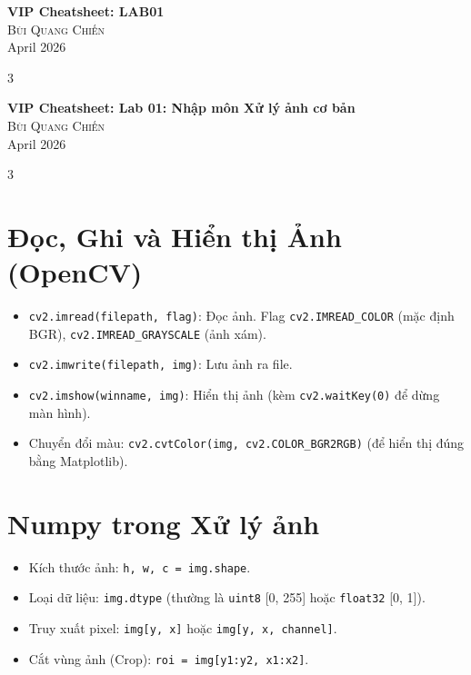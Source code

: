 \documentclass[9pt,landscape,a4paper]{extarticle}
\begin{document}
\begin{center}
    {\Large \bfseries VIP Cheatsheet: LAB01} \\
    \vspace{0.3cm}
    {\large \textsc{Bùi Quang Chiến}} \\
    \vspace{0.2cm}
    {\small April 2026}
\end{center}
\vspace{0.3cm}

\begin{multicols*}{3}

\begin{center}
    {\Large \bfseries VIP Cheatsheet: Lab 01: Nhập môn Xử lý ảnh cơ bản} \\
    \vspace{0.3cm}
    {\large \textsc{Bùi Quang Chiến}} \\
    \vspace{0.2cm}
    {\small April 2026}
\end{center}
\vspace{0.3cm}

\begin{multicols*}{3}

\section{Đọc, Ghi và Hiển thị Ảnh (OpenCV)}
\begin{itemize}
    \item \texttt{cv2.imread(filepath, flag)}: Đọc ảnh. Flag \texttt{cv2.IMREAD\_COLOR} (mặc định BGR), \texttt{cv2.IMREAD\_GRAYSCALE} (ảnh xám).
    \item \texttt{cv2.imwrite(filepath, img)}: Lưu ảnh ra file.
    \item \texttt{cv2.imshow(winname, img)}: Hiển thị ảnh (kèm \texttt{cv2.waitKey(0)} để dừng màn hình).
    \item Chuyển đổi màu: \texttt{cv2.cvtColor(img, cv2.COLOR\_BGR2RGB)} (để hiển thị đúng bằng Matplotlib).
\end{itemize}

\section{Numpy trong Xử lý ảnh}
\begin{itemize}
    \item Kích thước ảnh: \texttt{h, w, c = img.shape}.
    \item Loại dữ liệu: \texttt{img.dtype} (thường là \texttt{uint8} [0, 255] hoặc \texttt{float32} [0, 1]).
    \item Truy xuất pixel: \texttt{img[y, x]} hoặc \texttt{img[y, x, channel]}.
    \item Cắt vùng ảnh (Crop): \texttt{roi = img[y1:y2, x1:x2]}.
\end{itemize}

\end{multicols*}

\end{multicols*}
\end{document}
